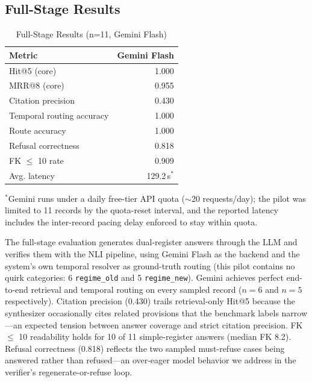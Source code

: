 \documentclass[conference]{IEEEtran}
\begin{document}
\subsection{Full-Stage Results}

\begin{table}[h]
\centering
\caption{Full-Stage Results (n=11, Gemini Flash)}
\label{tab:full}
\begin{tabular}{@{}lr@{}}
\toprule
\textbf{Metric} & \textbf{Gemini Flash} \\
\midrule
Hit@5 (core) & 1.000 \\
MRR@8 (core) & 0.955 \\
Citation precision & 0.430 \\
Temporal routing accuracy & 1.000 \\
Route accuracy & 1.000 \\
Refusal correctness & 0.818 \\
FK $\leq$ 10 rate & 0.909 \\
Avg. latency & 129.2\,s$^*$ \\
\bottomrule
\end{tabular}
\end{table}

$^*$Gemini runs under a daily free-tier API quota ($\sim$20 requests/day); the pilot was limited to 11 records by the quota-reset interval, and the reported latency includes the inter-record pacing delay enforced to stay within quota.

The full-stage evaluation generates dual-register answers through the LLM and verifies them with the NLI pipeline, using Gemini Flash as the backend and the system's own temporal resolver as ground-truth routing (this pilot contains no quirk categories: 6 \texttt{regime\_old} and 5 \texttt{regime\_new}). Gemini achieves perfect end-to-end retrieval and temporal routing on every sampled record ($n=6$ and $n=5$ respectively). Citation precision (0.430) trails retrieval-only Hit@5 because the synthesizer occasionally cites related provisions that the benchmark labels narrow---an expected tension between answer coverage and strict citation precision. FK $\leq$ 10 readability holds for 10 of 11 simple-register answers (median FK 8.2). Refusal correctness (0.818) reflects the two sampled must-refuse cases being answered rather than refused---an over-eager model behavior we address in the verifier's regenerate-or-refuse loop.
\end{document}
